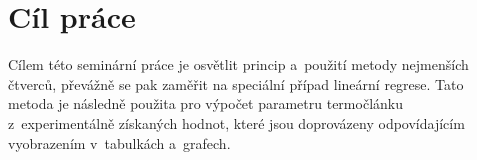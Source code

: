 \section{Cíl práce}
Cílem této seminární práce je osvětlit princip a~použití metody nejmenších
čtverců, převážně se pak zaměřit na speciální případ lineární regrese. Tato
metoda je následně použita pro výpočet parametru termočlánku z~experimentálně
získaných hodnot, které jsou doprovázeny odpovídajícím vyobrazením v~tabulkách
a~grafech. 
